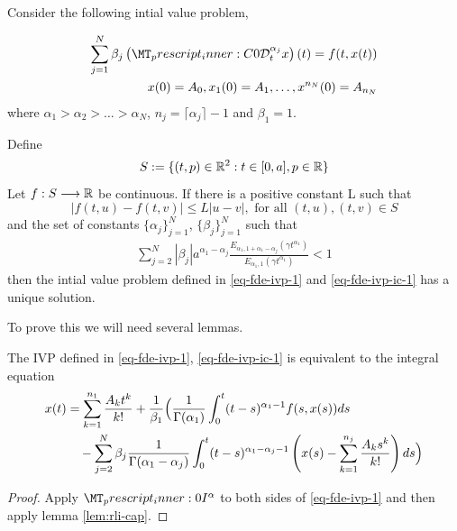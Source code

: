 \begin{mdframed}[innertopmargin=10pt]
\begin{theorem}[Uniqueness]
\label{thm-existence-uniq}
Consider the following intial value problem,

	\begin{align}
		\label{eq-fde-ivp-1}
		\sum_{j=1}^{N} \beta_j\capder{0}{t}{\alpha_j}{x}(t) = f(t,x(t)) \\
		\label{eq-fde-ivp-ic-1}
		x(0) = A_0, x_1(0) = A_1, \ldots, x^{n_N}(0) = A_{n_N}
	\end{align}
	where $ \alpha_1 > \alpha_2 > \ldots > \alpha_N $, 
	$ n_j = \lceil \alpha_j \rceil - 1 $ and $ \beta_1 = 1 $.
	
	Define
		$$ S:= \{ (t,p) \in \mathbb{R}^2 : t \in [0, a], p \in \mathbb{R} \} $$
	Let $ f : S \longrightarrow \mathbb{R} $ be continuous. If there is a positive constant L such that 
		$$ |f(t,u) - f(t,v)| \leq L|u-v|, \text{ for all } (t,u), (t,v) \in S $$
and the set of constants $ \{ \alpha_j \}_{j = 1}^{N} $, $ \{ \beta_j \}_{j=1}^N $
such that
	\begin{align}
	    \label{eq:fde-uniq-cond}
		\sum_{j=2}^N |\beta_j| a^{\alpha_1 - \alpha_j} \frac{E_{\alpha_1,1+\alpha_1-\alpha_j}(\gamma t^{\alpha_1})}{E_{\alpha_1,1}(\gamma t^{\alpha_1})} < 1
	\end{align}
	then the intial value problem defined in \ref{eq-fde-ivp-1} and \ref{eq-fde-ivp-ic-1} has a unique solution.
\end{theorem}
\end{mdframed}
To prove this we will need several lemmas. 
\begin{mdframed}[innertopmargin=10pt]
\begin{lemma}
	The IVP defined in \eqref{eq-fde-ivp-1}, \eqref{eq-fde-ivp-ic-1} is equivalent to the integral equation
	\begin{align}
		x(t) &= \sum_{k=1}^{n_1}\frac{A_kt^k}{k!} + \frac{1}{\beta_1} \Bigl( \frac{1}{\Gamma(\alpha_1)}\int_{0}^{t} (t-s)^{\alpha_1 - 1}f(s,x(s))ds \\
			& \ \ \ - \sum_{j=2}^{N}\beta_j \frac{1}{\Gamma(\alpha_1 - \alpha_j)}
			\int_{0}^{t}(t-s)^{\alpha_1 - \alpha_j - 1}\left(x(s) - \sum_{k=1}^{n_j}\frac{A_ks^k}{k!} \right) ds \Bigr)
	\end{align}
\end{lemma}
\end{mdframed}
\begin{proof}
	Apply $ \prescript{}{0}{I}^\alpha $ to both sides of \eqref{eq-fde-ivp-1} and then apply lemma \ref{lem:rli-cap}.
\end{proof}

